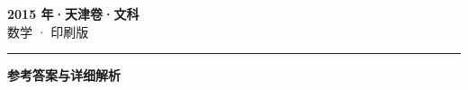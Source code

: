 \documentclass[zihao=5, a4paper]{ctexart}
\begin{document}
\begin{center}
  {\Large\bfseries 2015 年·天津卷·文科}\\[4pt]
  {\large 数学 · 印刷版}
\end{center}
\medskip
{}

\par\bigskip\hrule\bigskip
{}
\begin{center}{\large\bfseries 参考答案与详细解析}\end{center}
\smallskip

\end{document}
